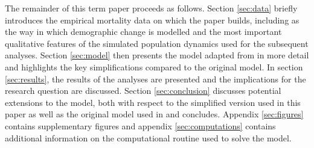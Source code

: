 The remainder of this term paper proceeds as follows. Section \ref{sec:data} briefly introduces the empirical mortality data on which the paper builds, including as the way in which demographic change is modelled and the most important qualitative features of the simulated population dynamics used for the subsequent analyses. Section \ref{sec:model} then presents the model adapted from \cite{LudwigSchelkleVogel2012} in more detail and highlights the key simplifications compared to the original model. In section \ref{sec:results}, the results of the analyses are presented and the implications for the research question are discussed. Section \ref{sec:conclusion} discusses potential extensions to the model, both with respect to the simplified version used in this paper as well as the original model used in \cite{LudwigSchelkleVogel2012} and concludes. Appendix \ref{sec:figures} contains supplementary figures and appendix \ref{sec:computations} contains additional information on the computational routine used to solve the model.
